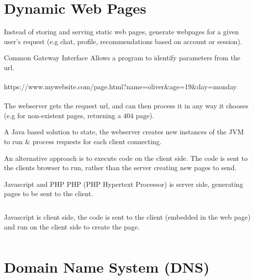 \section*{Dynamic Web Pages}
Instead of storing and serving static web pages, generate webpages for a given user's request (e.g chat, profile, recommendations based on account or session).
\begin{definitionbox}{Common Gateway Interface}
    Allows a program to identify parameters from the url.
    \\
    \\ https://www.mywebsite.com/page.html?name=oliver\&age=19\&day=monday
    \\
    \\ The webserver gets the request url, and can then process it in any way it chooses (e.g for non-existent pages, returning a $404$ page).
\end{definitionbox}

\begin{sidenotebox}
    A Java based solution to state, the webserver creates new instances of the JVM to run \& process requests for each client connecting.
\end{sidenotebox}

An alternative approach is to execute code on the client side. The code is sent to the clients browser to run, rather than the server creating new pages to send.
\begin{examplebox}{Javascript and PHP}
    PHP (PHP Hypertext Processor) is server side, generating pages to be sent to the client.
    \begin{center}
        \begin{minipage}[t]{0.9\textwidth}
            \inputminted{HTML}{the_web/code/php_example.html}
        \end{minipage}
    \end{center}
    Javascript is client side, the code is sent to the client (embedded in the web page) and run on the client side to create the page.
    \begin{center}
        \begin{minipage}[t]{0.9\textwidth}
            \inputminted{HTML}{the_web/code/javascript_example.html}
        \end{minipage}
    \end{center}
\end{examplebox}

\section{Domain Name System (DNS)}
